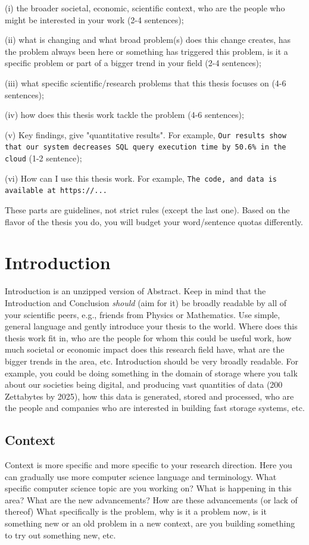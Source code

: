 \documentclass[11pt]{article}
\begin{document}
\noindent (i) the broader societal, economic, scientific context, who are the people who might be interested in your work (2-4 sentences);

\noindent (ii) what is changing and what broad problem(s) does this change creates, has the problem always been here or something has triggered this problem, is it a specific problem or part of a bigger trend in your field (2-4 sentences); 

\noindent (iii) what specific scientific/research problems that this thesis focuses on (4-6 sentences); 

\noindent (iv) how does this thesis work tackle the problem (4-6 sentences); 

\noindent (v) Key findings, give "quantitative results". For example, \texttt{Our results show that our system decreases SQL query execution time by 50.6\% in the cloud} (1-2 sentence); 

\noindent (vi) How can I use this thesis work. For example, \texttt{The code, and data is available at https://...}  


These parts are guidelines, not strict rules (except the last one). Based on the flavor of the thesis you do, you will budget your word/sentence quotas differently. 

\newpage 
\section{Introduction} 
Introduction is an unzipped version of Abstract. Keep in mind that the Introduction and Conclusion \textit{should} (aim for it) be broadly readable by all of your scientific peers, e.g., friends from Physics or Mathematics. Use simple, general language and gently introduce your thesis to the world. Where does this thesis work fit in, who are the people for whom this could be useful work, how much societal or economic impact does this research field have, what are the bigger trends in the area, etc. Introduction should be very broadly readable. For example, you could be doing something in the domain of storage where you talk about our societies being digital, and producing vast quantities of data (200 Zettabytes by 2025), how this data is generated, stored and processed, who are the people and companies who are interested in building fast storage systems, etc. 
\subsection{Context}
Context is more specific and more specific to your research direction. Here you can gradually use more computer science language and terminology. What specific computer science topic are you working on? What is happening in this area? What are the new advancements? How are these advancements (or lack of thereof) What specifically is the problem, why is it a problem now, is it something new or an old problem in a new context, are you building something to try out something new, etc. 
\end{document}
